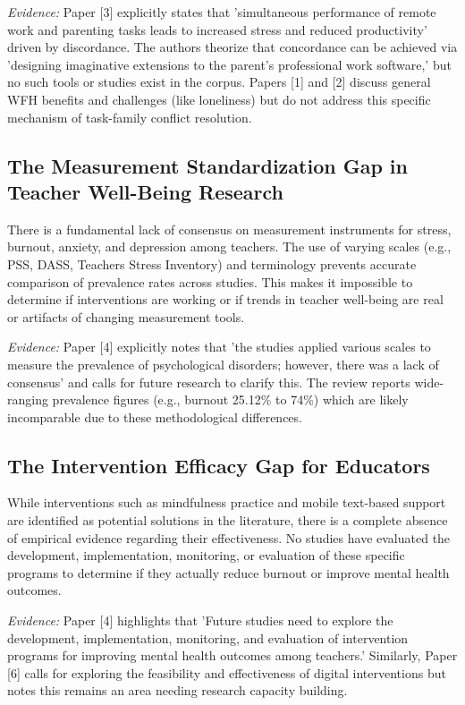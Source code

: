 \documentclass[11pt]{article}
\begin{document}
\textit{Evidence:} Paper [3] explicitly states that 'simultaneous performance of remote work and parenting tasks leads to increased stress and reduced productivity' driven by discordance. The authors theorize that concordance can be achieved via 'designing imaginative extensions to the parent's professional work software,' but no such tools or studies exist in the corpus. Papers [1] and [2] discuss general WFH benefits and challenges (like loneliness) but do not address this specific mechanism of task-family conflict resolution.

\subsection{The Measurement Standardization Gap in Teacher Well-Being Research}
There is a fundamental lack of consensus on measurement instruments for stress, burnout, anxiety, and depression among teachers. The use of varying scales (e.g., PSS, DASS, Teachers Stress Inventory) and terminology prevents accurate comparison of prevalence rates across studies. This makes it impossible to determine if interventions are working or if trends in teacher well-being are real or artifacts of changing measurement tools.

\textit{Evidence:} Paper [4] explicitly notes that 'the studies applied various scales to measure the prevalence of psychological disorders; however, there was a lack of consensus' and calls for future research to clarify this. The review reports wide-ranging prevalence figures (e.g., burnout 25.12\% to 74\%) which are likely incomparable due to these methodological differences.

\subsection{The Intervention Efficacy Gap for Educators}
While interventions such as mindfulness practice and mobile text-based support are identified as potential solutions in the literature, there is a complete absence of empirical evidence regarding their effectiveness. No studies have evaluated the development, implementation, monitoring, or evaluation of these specific programs to determine if they actually reduce burnout or improve mental health outcomes.

\textit{Evidence:} Paper [4] highlights that 'Future studies need to explore the development, implementation, monitoring, and evaluation of intervention programs for improving mental health outcomes among teachers.' Similarly, Paper [6] calls for exploring the feasibility and effectiveness of digital interventions but notes this remains an area needing research capacity building.
\end{document}
